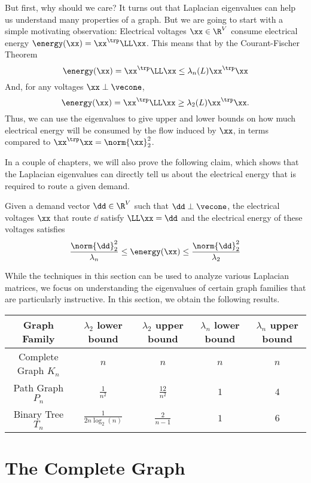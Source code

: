 But first, why should we care? It turns out that Laplacian eigenvalues can help us understand many properties of a graph.
But we are going to start with a simple motivating observation: Electrical
voltages $\xx \in \R^V$ consume electrical energy $\energy(\xx) =
\xx^{\trp} \LL \xx$.
This means that by the Courant-Fischer Theorem
\[
  \energy(\xx) =
  \xx^{\trp} \LL \xx \leq \lambda_n(L)  \xx^{\trp} \xx
\]
And, for any voltages $\xx \perp \vecone$, 
\[
  \energy(\xx) =
  \xx^{\trp} \LL \xx \geq \lambda_2(L)  \xx^{\trp} \xx.
\]
Thus, we can use the eigenvalues to give upper and lower bounds on how
much electrical energy will be consumed by the flow induced by $\xx$,
in terms compared to $\xx^{\trp} \xx = \norm{\xx}_2^2$.

In a couple of chapters, we will also prove the following claim, which
shows that the Laplacian eigenvalues can directly tell us about the
electrical energy that is required to route a given demand.

\begin{claim}
  Given a demand vector
  $\dd \in \R^V$ such that $\dd \perp \vecone$,
  the electrical voltages $\xx$ that route $\dd$ satisfy $\LL \xx =
  \dd$ and the electrical energy of these voltages satisfies
  \[
\frac{\norm{\dd}_2^2}{\lambda_n} \leq \energy(\xx) \leq \frac{\norm{\dd}_2^2}{\lambda_2}
    \]
\end{claim}

While the techniques in this section can be used to analyze various Laplacian matrices, we focus on understanding the eigenvalues of certain graph families that are particularly instructive. In this section, we obtain the following results.

\begin{center}\setlength\extrarowheight{5pt}
\begin{tabular}{ | c | c | c | c | c | }
\hline
 Graph Family & $\lambda_2$ lower bound & $\lambda_2$ upper bound & $\lambda_n$ lower bound & $\lambda_n$ upper bound\\ \hline 
 Complete Graph $K_n$ & $n$ & $n$ & $n$ & $n$\\ \hline 
 Path Graph $P_n$ & $\frac{1}{n^2}$ & $\frac{12}{n^2}$ & $1$ & $4$\\ \hline 
 Binary Tree $T_n$ & $\frac{1}{2n \log_2(n)}$ & $\frac{2}{n-1}$ & $1$ & $6$\\ \hline 
\end{tabular}
\end{center}

\section{The Complete Graph}

